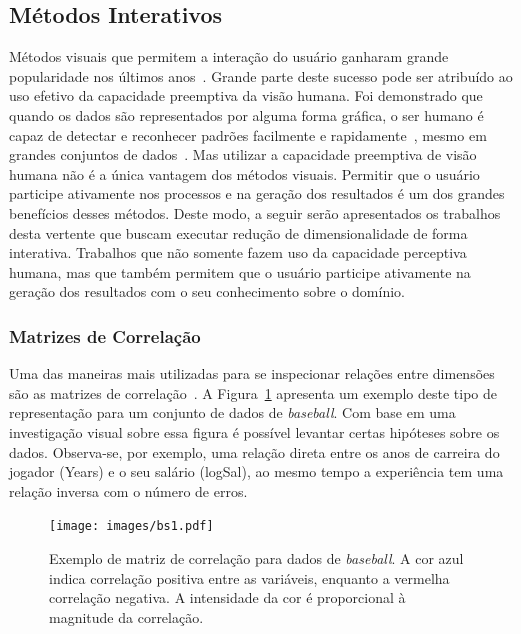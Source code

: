 \subsection{Métodos Interativos}\label{ss:int}

Métodos visuais que permitem a interação do usuário ganharam
grande popularidade nos últimos anos~\cite{State2012}.
Grande parte deste sucesso pode ser atribuído ao uso efetivo
da capacidade preemptiva da visão humana. Foi demonstrado
que quando os dados são representados por alguma forma
gráfica, o ser humano é capaz de detectar e reconhecer
padrões facilmente e rapidamente~\cite{Healey1995}, mesmo em
grandes conjuntos de dados~\cite{Fodor2002}. Mas utilizar a
capacidade preemptiva de visão humana não é a única vantagem
dos métodos visuais. Permitir que o usuário participe
ativamente nos processos e na geração dos resultados é um
dos grandes benefícios desses métodos. Deste
modo, a seguir serão apresentados os trabalhos desta 
vertente que buscam executar redução de dimensionalidade de
forma interativa. Trabalhos que não somente fazem uso da
capacidade perceptiva humana, mas que também permitem
que o usuário participe ativamente na geração dos resultados
com o seu conhecimento sobre o domínio.

\subsubsection{Matrizes de Correlação}\label{sss:cormat}

Uma das maneiras mais utilizadas para se inspecionar
relações entre dimensões são as matrizes de
correlação~\cite{Friendly2002}. A Figura~\ref{fig:bs1}
apresenta um exemplo deste tipo de representação para um
conjunto de dados de \emph{baseball}. Com base em uma
investigação visual sobre essa figura é possível levantar
certas hipóteses sobre os dados. Observa-se, por exemplo,
uma relação direta entre os anos de carreira do jogador
(Years) e o seu salário (logSal), ao mesmo tempo a
experiência tem uma relação inversa com o número de erros.

\begin{figure}[h!]
    \centering
    \texttt{[image: images/bs1.pdf]}
    \caption[Matrizes de Correlação]
    {Exemplo de matriz de correlação para dados de
    \emph{baseball}. A cor azul indica correlação
    positiva entre as variáveis, enquanto a vermelha
    correlação negativa. A intensidade da cor é
    proporcional à magnitude da correlação.}
    \label{fig:bs1}
\end{figure}

